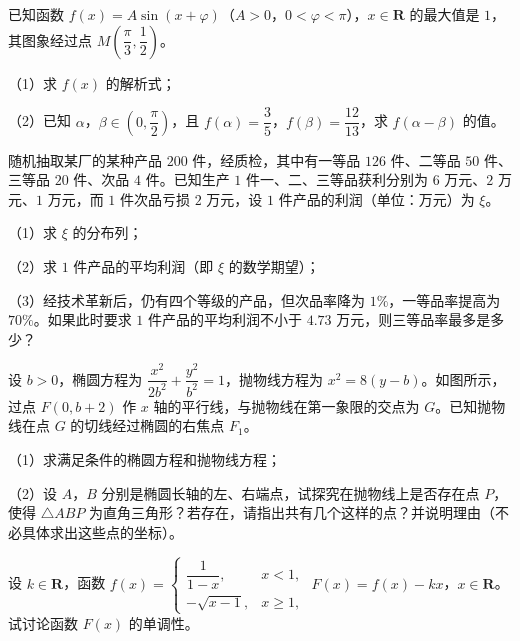 \begin{question}
已知函数 $f(x)=A\sin(x+\varphi)$（$A>0$，$0<\varphi<\pi$），$x\in\mathbf R$ 的最大值是 $1$，其图象经过点 $M\left(\dfrac{\pi}{3},\dfrac12\right)$。

（1）求 $f(x)$ 的解析式；

（2）已知 $\alpha$，$\beta\in\left(0,\dfrac{\pi}{2}\right)$，且 $f(\alpha)=\dfrac35$，$f(\beta)=\dfrac{12}{13}$，求 $f(\alpha-\beta)$ 的值。

\end{question}
\begin{question}
随机抽取某厂的某种产品 $200$ 件，经质检，其中有一等品 $126$ 件、二等品 $50$ 件、三等品 $20$ 件、次品 $4$ 件。已知生产 $1$ 件一、二、三等品获利分别为 $6$ 万元、$2$ 万元、$1$ 万元，而 $1$ 件次品亏损 $2$ 万元，设 $1$ 件产品的利润（单位：万元）为 $\xi$。

（1）求 $\xi$ 的分布列；

（2）求 $1$ 件产品的平均利润（即 $\xi$ 的数学期望）；

（3）经技术革新后，仍有四个等级的产品，但次品率降为 $1\%$，一等品率提高为 $70\%$。如果此时要求 $1$ 件产品的平均利润不小于 $4.73$ 万元，则三等品率最多是多少？

\Needspace{0.4\textheight}
\end{question}
\begingroup
\renewenvironment{question}{\Needspace{0.5\textheight}}{}
\begin{question}
设 $b>0$，椭圆方程为 $\dfrac{x^2}{2b^2}+\dfrac{y^2}{b^2}=1$，抛物线方程为 $x^2=8(y-b)$。如图所示，过点 $F(0,b+2)$ 作 $x$ 轴的平行线，与抛物线在第一象限的交点为 $G$。已知抛物线在点 $G$ 的切线经过椭圆的右焦点 $F_1$。

（1）求满足条件的椭圆方程和抛物线方程；

（2）设 $A$，$B$ 分别是椭圆长轴的左、右端点，试探究在抛物线上是否存在点 $P$，使得 $\triangle ABP$ 为直角三角形？若存在，请指出共有几个这样的点？并说明理由（不必具体求出这些点的坐标）。
\nopagebreak[4]
\begin{center}\end{center}
\nopagebreak[4]
\end{question}
\endgroup
\begin{question}
设 $k\in\mathbf R$，函数 $f(x)=\begin{cases}\dfrac1{1-x},&x<1,\\ -\sqrt{x-1},&x\geqslant1,\end{cases}$ $F(x)=f(x)-kx$，$x\in\mathbf R$。试讨论函数 $F(x)$ 的单调性。

\Needspace{0.4\textheight}
\end{question}
